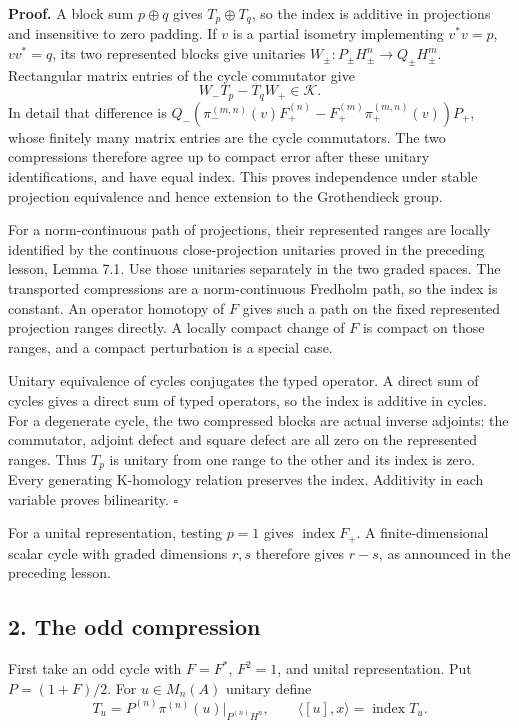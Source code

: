 \documentclass[
  11pt,
]{article}
\begin{document}
\textbf{Proof.} A block sum \(p\oplus q\) gives \(T_p\oplus T_q\), so
the index is additive in projections and insensitive to zero padding. If
\(v\) is a partial isometry implementing \(v^*v=p\), \(vv^*=q\), its two
represented blocks give unitaries
\(W_\pm:P_\pm H_\pm^n\to Q_\pm H_\pm^m\). Rectangular matrix entries of
the cycle commutator give \[
W_-T_p-T_qW_+\in\mathcal K.
\] In detail that difference is
\(Q_-(\pi_-^{(m,n)}(v)F_+^{(n)}-F_+^{(m)}\pi_+^{(m,n)}(v))P_+\), whose
finitely many matrix entries are the cycle commutators. The two
compressions therefore agree up to compact error after these unitary
identifications, and have equal index. This proves independence under
stable projection equivalence and hence extension to the Grothendieck
group.

For a norm-continuous path of projections, their represented ranges are
locally identified by the continuous close-projection unitaries proved
in the preceding lesson, Lemma 7.1. Use those unitaries separately in
the two graded spaces. The transported compressions are a
norm-continuous Fredholm path, so the index is constant. An operator
homotopy of \(F\) gives such a path on the fixed represented projection
ranges directly. A locally compact change of \(F\) is compact on those
ranges, and a compact perturbation is a special case.

Unitary equivalence of cycles conjugates the typed operator. A direct
sum of cycles gives a direct sum of typed operators, so the index is
additive in cycles. For a degenerate cycle, the two compressed blocks
are actual inverse adjoints: the commutator, adjoint defect and square
defect are all zero on the represented ranges. Thus \(T_p\) is unitary
from one range to the other and its index is zero. Every generating
K-homology relation preserves the index. Additivity in each variable
proves bilinearity. \(\square\)

For a unital representation, testing \(p=1\) gives
\(\operatorname{index}F_+\). A finite-dimensional scalar cycle with
graded dimensions \(r,s\) therefore gives \(r-s\), as announced in the
preceding lesson.

\subsection{2. The odd compression}\label{the-odd-compression}

First take an odd cycle with \(F=F^*\), \(F^2=1\), and unital
representation. Put \(P=(1+F)/2\). For \(u\in M_n(A)\) unitary define \[
T_u=P^{(n)}\pi^{(n)}(u)|_{P^{(n)}H^n},
\qquad
\langle[u],x\rangle=\operatorname{index}T_u.
\tag{2.1}
\]
\end{document}
